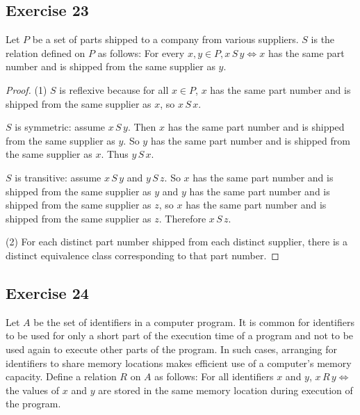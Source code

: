 \documentclass[14pt]{extarticle}
\begin{document}
\subsection{Exercise 23}
Let \(P\) be a set of parts shipped to a company from various suppliers. \(S\) is the relation defined on \(P\)
as follows: For every \(x, y \in P, x \,S\, y \iff x\) has the same part number and is shipped from the same supplier
as \(y\).

\begin{proof}
        (1) \(S\) is reflexive because for all \(x \in P\), \(x\) has the same part number and is shipped from the same
        supplier as \(x\), so \(x \, S \, x\).

        \(S\) is symmetric: assume \(x \,S\, y\). Then \(x\) has the same part number and is shipped from the same supplier
        as \(y\). So \(y\) has the same part number and is shipped from the same supplier as \(x\). Thus \(y \,S\, x\).

        \(S\) is transitive: assume \(x \,S\, y\) and \(y \,S\, z\). So \(x\) has the same part number and is shipped from
        the same supplier as \(y\) and \(y\) has the same part number and is shipped from the same supplier as \(z\), so
        \(x\) has the same part number and is shipped from the same supplier as \(z\). Therefore \(x \,S\, z\).

        (2) For each distinct part number shipped from each distinct supplier, there is a distinct equivalence class
        corresponding to that part number.
\end{proof}

\subsection{Exercise 24}
Let \(A\) be the set of identifiers in a computer program. It is common for identifiers to be used for only a short
part of the execution time of a program and not to be used again to execute other parts of the program. In such cases,
arranging for identifiers to share memory locations makes efficient use of a computer’s memory capacity. Define a
relation \(R\) on \(A\) as follows: For all identifiers \(x\) and \(y\), \(x \,R\, y \iff\) the values of \(x\) and
\(y\) are stored in the same memory location during execution of the program.
\end{document}
